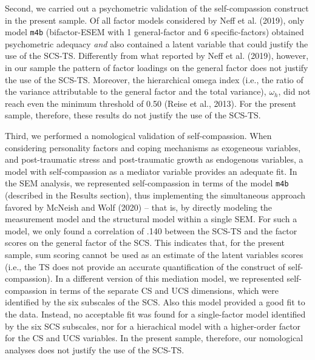 \documentclass[
  man]{apa7}
\begin{document}
Second, we carried out a psychometric validation of the self-compassion construct in the present sample. Of all factor models considered by Neff et al. (2019), only model \texttt{m4b} (bifactor-ESEM with 1 general-factor and 6 specific-factors) obtained psychometric adequacy \emph{and} also contained a latent variable that could justify the use of the SCS-TS. Differently from what reported by Neff et al. (2019), however, in our sample the pattern of factor loadings on the general factor does not justify the use of the SCS-TS. Moreover, the hierarchical omega index (i.e., the ratio of the variance attributable to the general factor and the total variance), \(\omega_h\), did not reach even the minimum threshold of 0.50 (Reise et al., 2013). For the present sample, therefore, these results do not justify the use of the SCS-TS.

Third, we performed a nomological validation of self-compassion. When considering personality factors and coping mechanisms as exogeneous variables, and post-traumatic stress and post-traumatic growth as endogenous variables, a model with self-compassion as a mediator variable provides an adequate fit. In the SEM analysis, we represented self-compassion in terms of the model \texttt{m4b} (described in the Results section), thus implementing the simultaneous approach favored by McNeish and Wolf (2020) -- that is, by directly modeling the measurement model and the structural model within a single SEM. For such a model, we only found a correlation of .140 between the SCS-TS and the factor scores on the general factor of the SCS. This indicates that, for the present sample, sum scoring cannot be used as an estimate of the latent variables scores (i.e., the TS does not provide an accurate quantification of the construct of self-compassion). In a different version of this mediation model, we represented self-compassion in terms of the separate CS and UCS dimensions, which were identified by the six subscales of the SCS. Also this model provided a good fit to the data. Instead, no acceptable fit was found for a single-factor model identified by the six SCS subscales, nor for a hierachical model with a higher-order factor for the CS and UCS variables. In the present sample, therefore, our nomological analyses does not justify the use of the SCS-TS.
\end{document}
